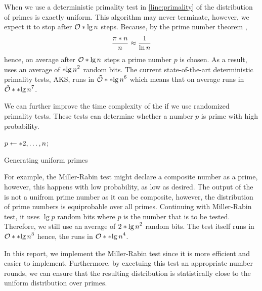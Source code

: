 When we use a deterministic primality test in \cref{line:primality} of  the distribution of primes is exactly uniform. This algorithm may never terminate, however, we expect it to stop after \(\bigO{\lg n}\) steps. Because, by the prime number theorem \cite{apostol}, 
\begin{equation}
    \dfrac{\func{\pi}{n}}{n} \approx \dfrac{1}{\ln n}
\end{equation}
hence, on average after \(\bigO{\lg n}\) steps a prime number \(p\) is chosen. As a result,  uses an average of \(\bracket{\lg n}^2\) random bits. The current state-of-the-art deterministic primality tests, AKS, runs in \(\logBigO{\bracket{\lg n}^6}\) \cite{lenstra} which means that on average  runs in \(\logBigO{\bracket{\lg n}^7}\). 

We can further improve the time complexity of the  if we use randomized primality tests. These tests can determine whether a number \(p\) is prime with high probability. 
\begin{algorithm}
	\DontPrintSemicolon
    {
        \(p \gets \set{2,\dots, n}\);
    }
	\caption{Generating uniform primes}
    \label{alg:trivialRPNG}
\end{algorithm}

For example, the Miller-Rabin test might declare a composite number as a prime, however, this happens with low probability, as low as desired. The output of the  is not a unifrom prime number as it can be composite, however, the distribution of prime numbers is equiprobable over all primes. Continuing with Miller-Rabin test, it uses \(\lg p\) random bits where \(p\) is the number that is to be tested. Therefore, we still use an average of \(2\bracket{\lg n}^2\) random bits. The test itself runs in \(\bigO{\bracket{\lg n}^3}\) \cite{bach} hence, the  runs in \(\bigO{\bracket{\lg n}^4}\).

In this report, we implement the Miller-Rabin test since it is more efficient and easier to implement. Furthermore, by exectuing this test an appropriate number rounds, we can ensure that the resulting distribution is statistically close to the uniform distribution over primes.

